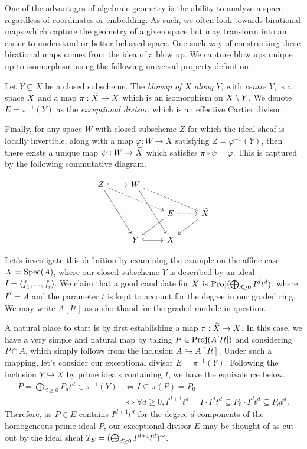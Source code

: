 One of the advantages of algebraic geometry is the ability to analyze a space regardless of coordinates or embedding. 
As such, we often look towards birational maps which capture the geometry of a given space but may transform into an easier to understand or better behaved space.
One such way of constructing these birational maps comes from the idea of a blow up.
We capture blow ups unique up to isomorphism using the following universal property definition.

\begin{definition}[Blow up]
    Let $Y \subseteq X$ be a closed subscheme.
    The \textit{blowup of $X$ along $Y$}, with \textit{centre} $Y$, 
    is a space $\widetilde{X}$ and a map $\pi : \widetilde X \to X$ which is an isomorphism on $X \setminus Y$.
    We denote $E = \pi^{-1}(Y)$ as the \textit{exceptional divisor}, which is an effective Cartier divisor.

    Finally, for any space $W$ with closed subscheme $Z$ for which the ideal sheaf is locally invertible,
    along with a map $\varphi : W \to X$ satisfying $Z =\varphi^{-1}(Y)$,
    then there exists a unique map $\psi : W \to \widetilde X$ which satisfies $\pi \circ \psi = \varphi$.
    This is captured by the following commutative diagram.

    \[
        \begin{tikzcd}
            Z \arrow[r, hook] \arrow[ddr] \arrow[drr, dashed] & W \arrow[ddr] \arrow[drr, dashed] & \\
            & & E \arrow[r, hook] \arrow[dl] & \wt X \arrow[dl] \\
            & Y \arrow[r, hook] & X &
        \end{tikzcd}
    \]
\end{definition}

Let's investigate this definition by examining the example on the affine case ${X = {\rm Spec}(A)}$,
where our closed subscheme $Y$ is described by an ideal $I = \langle f_1, \ldots, f_r \rangle$. 
We claim that a good candidate for $\widetilde X$ is ${\rm Proj}(\bigoplus_{d \geq 0} I^dt^d)$,
where $I^d = A$ and the parameter $t$ is kept to account for the degree in our graded ring.
We may write $A[It]$ as a shorthand for the graded module in question.

A natural place to start is by first establishing a map $\pi : \widetilde X \to X$.
In this case, we have a very simple and natural map by taking $P \in {\rm Proj}(A[It])$ and considering $P \cap A$,
which simply follows from the inclusion $A \hookrightarrow A[It]$.
Under such a mapping, let's consider our exceptional divisor $E = \pi^{-1}(Y)$.
Following the inclusion $Y \hookrightarrow X$ by prime ideals containing $I$,
we have the equivalence below.
\begin{align*}
    P = \bigoplus_{d \geq 0} P_d t^d \in \pi^{-1}(Y) 
        & \iff I \subseteq \pi(P) = P_0 \\
        & \iff \forall d \geq 0, I^{d + 1}t^d = I \cdot I^dt^d \subseteq P_0 \cdot I^dt^d \subseteq P_dt^d. 
\end{align*}
Therefore, as $P \in E$ contains $I^{d + 1}t^d$ for the degree $d$ components of the homogeneous prime ideal $P$,
our exceptional divisor $E$ may be thought of as cut out by the ideal sheaf $\mathcal{I}_E = (\bigoplus_{d \geq 0} I^{d + 1}t^d)^{\sim}$.

